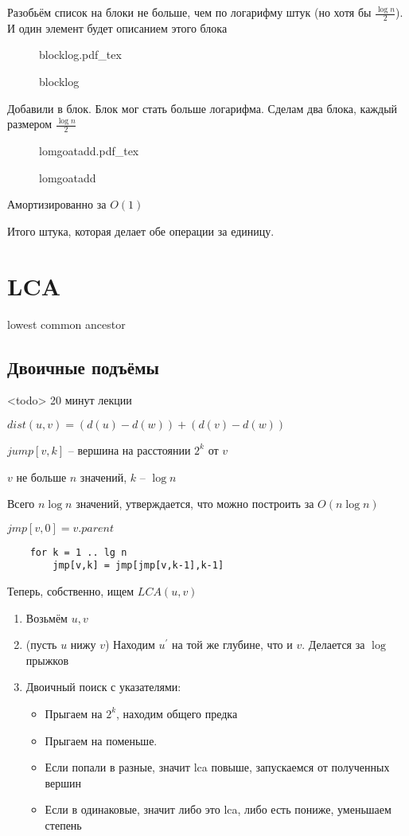 \documentclass{book}
\newcommand{\p}[1]{#1^{\prime}}
\theoremstyle{definition}
\newcommand{\incfig}[1]{%
    \def\svgwidth{\columnwidth}
    {#1.pdf_tex}
}
\begin{document}
Разобьём список на блоки не больше, чем по логарифму штук (но хотя бы $\frac{\log n}{2}$). И один элемент будет описанием этого блока

\begin{figure}[!ht]
    \centering
    \incfig{blocklog}
    \caption{blocklog}
    \label{fig:blocklog}
\end{figure}

Добавили в блок. Блок мог стать больше логарифма. Сделам два блока, каждый размером $\frac{\log n}{2}$ 

\begin{figure}[!ht]
    \centering
    \incfig{lomgoatadd}
    \caption{lomgoatadd}
    \label{fig:lomgoatadd}
\end{figure}

Амортизированно за $O(1)$

Итого штука, которая делает обе операции за единицу.




\section{LCA}

lowest common ancestor

\subsection{Двоичные подъёмы}

<todo> 20 минут лекции

$dist\left( u,v \right)  = \left( d(u) - d(w) \right)  + \left( d(v) - d(w) \right) $ 

$jump[v,k]$ -- вершина на расстоянии $2^k$ от $v$

 $v$ не больше  $n$ значений,  $k$ --  $\log n$

 Всего $n\log n$ значений, утверждается, что можно построить за $O(n\log n)$

 $jmp[v,0] = v.parent$
 \begin{lstlisting}
    for k = 1 .. lg n
        jmp[v,k] = jmp[jmp[v,k-1],k-1]
\end{lstlisting}    

Теперь, собственно, ищем $LCA(u,v)$
\begin{enumerate}
    \item Возьмём $u, v$
    \item (пусть $u$ нижу  $v$) Находим  $\p u$ на той же глубине, что и  $v$. Делается за  $\log $ прыжков
    \item Двоичный поиск с указателями:
        \begin{itemize}
            \item  Прыгаем на $2^k$, находим общего предка
            \item Прыгаем на поменьше.
            \item Если попали в разные, значит lca повыше, запускаемся от полученных вершин
            \item Если в одинаковые, значит либо это lca, либо есть пониже, уменьшаем степень
        \end{itemize}
\end{enumerate}
\end{document}
